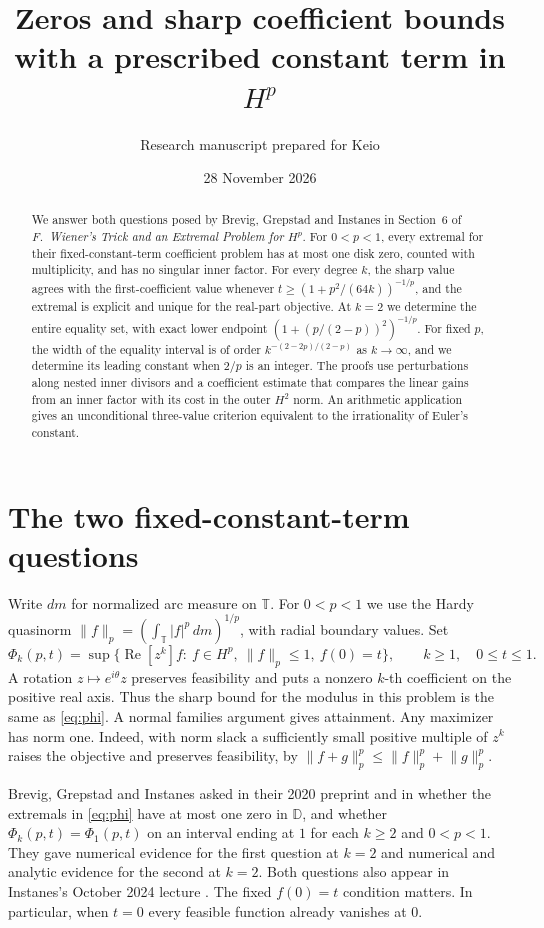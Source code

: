 \documentclass[11pt]{article}
\title{Zeros and sharp coefficient bounds with a prescribed constant term in \(H^p\)}
\author{Research manuscript prepared for Keio}
\date{28 November 2026}
\numberwithin{equation}{section}
\theoremstyle{remark}
\newcommand{\D}{\mathbb D}
\newcommand{\T}{\mathbb T}
\newcommand{\norm}[1]{\lVert #1\rVert}
\newcommand{\coef}[1]{[z^{#1}]}
\newcommand{\area}{\,dm}
\newcommand{\Rea}{\operatorname{Re}}
\begin{document}
\maketitle

\begin{abstract}
We answer both questions posed by Brevig, Grepstad and Instanes
in Section~6 of \emph{F.~Wiener's Trick and an Extremal Problem for \(H^p\)}.
For \(0<p<1\), every extremal for their fixed-constant-term coefficient problem
has at most one disk zero, counted with multiplicity, and has no singular inner
factor. For every degree \(k\), the sharp value agrees with the first-coefficient
value whenever \(t\ge (1+p^2/(64k))^{-1/p}\), and the extremal is explicit and
unique for the real-part objective. At \(k=2\) we determine the entire
equality set, with exact lower endpoint
\((1+(p/(2-p))^2)^{-1/p}\).
For fixed \(p\), the width of the equality interval is of order
\(k^{-(2-2p)/(2-p)}\) as \(k\to\infty\), and we determine its leading
constant when \(2/p\) is an integer.
The proofs use perturbations along nested inner divisors and a coefficient
estimate that compares the linear gains from an inner factor with its cost
in the outer \(H^2\) norm. An arithmetic application gives an unconditional
three-value criterion equivalent to the irrationality of Euler's constant.
\end{abstract}

\section{The two fixed-constant-term questions}

Write \(dm\) for normalized arc measure on \(\T\). For \(0<p<1\) we use the
Hardy quasinorm \(\norm{f}_p=(\int_{\T}|f|^p\area)^{1/p}\), with radial boundary
values. Set
\begin{equation}\label{eq:phi}
 \Phi_k(p,t)=\sup\bigl\{\Rea\coef{k}f:\ f\in H^p,\ \norm{f}_p\le1,\ f(0)=t\bigr\},
 \qquad k\ge1,\quad 0\le t\le1 .
\end{equation}
A rotation \(z\mapsto e^{i\theta}z\) preserves feasibility and puts
a nonzero \(k\)-th coefficient on the positive real axis. Thus the sharp
bound for the modulus in this problem is the same as \eqref{eq:phi}.
A normal families argument gives attainment. Any maximizer has norm one.
Indeed, with norm slack a sufficiently small positive multiple of \(z^k\)
raises the objective and preserves feasibility, by
\(\norm{f+g}_p^p\le\norm{f}_p^p+\norm{g}_p^p\).

Brevig, Grepstad and Instanes asked in their 2020 preprint and in
\cite[Section~6]{BGI} whether the
extremals in \eqref{eq:phi} have at most one zero in \(\D\), and whether
\(\Phi_k(p,t)=\Phi_1(p,t)\) on an interval ending at \(1\) for each
\(k\ge2\) and \(0<p<1\). They gave numerical evidence for the first
question at \(k=2\) and numerical and analytic evidence for the second
at \(k=2\). Both questions also appear in Instanes's October 2024
lecture \cite[slides 25--26]{Instanes}. The fixed \(f(0)=t\)
condition matters. In particular, when \(t=0\) every feasible
function already vanishes at \(0\).
\end{document}
